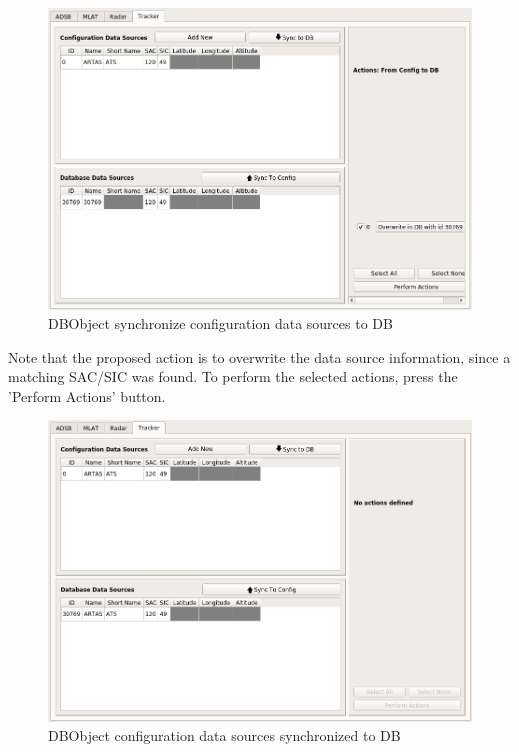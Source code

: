 \begin{figure}[H]
  \center
    \includegraphics[width=16cm,frame]{../screenshots/manage_data_sources_edit_ds_sync2db.png}
  \caption{DBObject synchronize configuration data sources to DB}
\end{figure}

Note that the proposed action is to overwrite the data source information, since a matching SAC/SIC was found. To perform the selected actions, press the 'Perform Actions' button.

\begin{figure}[H]
  \center
    \includegraphics[width=16cm,frame]{../screenshots/manage_data_sources_edit_ds_cfg2dbsynced.png}
  \caption{DBObject configuration data sources synchronized to DB}
\end{figure}

